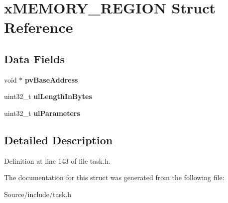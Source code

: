 \hypertarget{structx_m_e_m_o_r_y___r_e_g_i_o_n}{}\section{x\+M\+E\+M\+O\+R\+Y\+\_\+\+R\+E\+G\+I\+O\+N Struct Reference}
\label{structx_m_e_m_o_r_y___r_e_g_i_o_n}
\subsection*{Data Fields}
\begin{DoxyCompactItemize}
\item 
\hypertarget{structx_m_e_m_o_r_y___r_e_g_i_o_n_a5c540d9e8ba79b50b9600f7225d41268}{}void $\ast$ {\bfseries pv\+Base\+Address}\label{structx_m_e_m_o_r_y___r_e_g_i_o_n_a5c540d9e8ba79b50b9600f7225d41268}

\item 
\hypertarget{structx_m_e_m_o_r_y___r_e_g_i_o_n_a53924a8e3f7db81a7803b646573864c6}{}uint32\+\_\+t {\bfseries ul\+Length\+In\+Bytes}\label{structx_m_e_m_o_r_y___r_e_g_i_o_n_a53924a8e3f7db81a7803b646573864c6}

\item 
\hypertarget{structx_m_e_m_o_r_y___r_e_g_i_o_n_a8339f23aad15c6b829547a17f839f32c}{}uint32\+\_\+t {\bfseries ul\+Parameters}\label{structx_m_e_m_o_r_y___r_e_g_i_o_n_a8339f23aad15c6b829547a17f839f32c}

\end{DoxyCompactItemize}


\subsection{Detailed Description}


Definition at line 143 of file task.\+h.



The documentation for this struct was generated from the following file\+:\begin{DoxyCompactItemize}
\item 
Source/include/task.\+h\end{DoxyCompactItemize}
